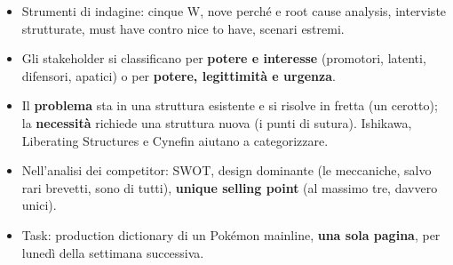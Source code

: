 \begin{itemize}
        ha regole (Cina, Germania, Belgio) a cui pensare prima.
  \item Strumenti di indagine: cinque W, nove perché e root cause analysis,
        interviste strutturate, must have contro nice to have, scenari
        estremi.
  \item Gli stakeholder si classificano per \textbf{potere e interesse}
        (promotori, latenti, difensori, apatici) o per \textbf{potere,
        legittimità e urgenza}.
  \item Il \textbf{problema} sta in una struttura esistente e si risolve in
        fretta (un cerotto); la \textbf{necessità} richiede una struttura nuova
        (i punti di sutura). Ishikawa, Liberating Structures e Cynefin aiutano
        a categorizzare.
  \item Nell'analisi dei competitor: SWOT, design dominante (le meccaniche,
        salvo rari brevetti, sono di tutti), \textbf{unique selling point}
        (al massimo tre, davvero unici).
  \item Task: production dictionary di un Pokémon mainline, \textbf{una sola
        pagina}, per lunedì della settimana successiva.
\end{itemize}
